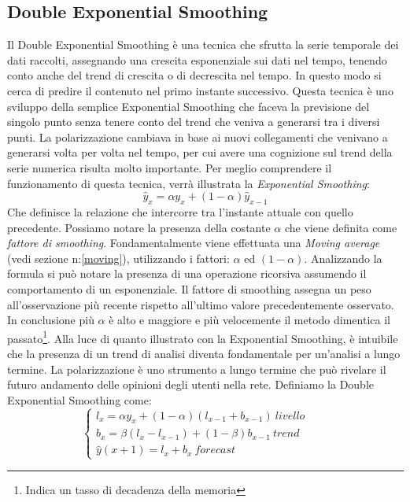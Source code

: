 \subsection{Double Exponential Smoothing}
Il Double Exponential Smoothing è una tecnica che sfrutta la serie temporale dei dati raccolti, assegnando una crescita esponenziale sui dati nel tempo, tenendo conto anche del trend di crescita o di decrescita nel tempo. In questo modo si cerca di predire il contenuto nel primo instante successivo.
Questa tecnica è uno sviluppo della semplice Exponential Smoothing che faceva la previsione del singolo punto senza tenere conto del trend che veniva a generarsi tra i diversi punti. 
La polarizzazione cambiava in base ai nuovi collegamenti che venivano a generarsi volta per volta nel tempo, per cui avere una cognizione sul trend della serie numerica risulta molto importante.
Per meglio comprendere il funzionamento di questa tecnica, verrà illustrata la \textit{Exponential Smoothing}:
\begin{equation}\label{singleExp}
\widehat{y}_{x}= \alpha y_{x} + (1-\alpha)\widehat{y}_{x-1}
\end{equation}
Che definisce la relazione che intercorre tra l'instante attuale con quello precedente. Possiamo notare la presenza della costante $\alpha$ che viene definita come \textit{fattore di smoothing}. Fondamentalmente viene effettuata una \textit{Moving average} (vedi sezione n:\ref{moving}), utilizzando i fattori: $\alpha$ ed $(1-\alpha)$.
Analizzando la formula si può notare la presenza di una operazione ricorsiva assumendo il comportamento di un esponenziale.
Il fattore di smoothing assegna un peso all'osservazione più recente rispetto all'ultimo valore precedentemente osservato. In conclusione più $\alpha$ è alto e maggiore e più velocemente il metodo dimentica il passato\footnote{Indica un tasso di decadenza della memoria}.
Alla luce di quanto illustrato con la Exponential Smoothing, è intuibile che la presenza di un trend di analisi diventa fondamentale per un'analisi a lungo termine. La polarizzazione è uno strumento a lungo termine che può rivelare il futuro andamento delle opinioni degli utenti nella rete.
Definiamo la Double Exponential Smoothing come:
\[
\begin{cases}
    l_{x}= \alpha y_{x} +(1-\alpha)(l_{x-1}+ b_{x-1}) \ livello        & \quad \\
    b_{x}= \beta (l_{x}-l_{x-1}) +(1-\beta)b_{x-1}  \ trend        & \quad \\
   \widehat{y}(x+1)=  l_{x} + b_{x} \ forecast    & \quad 
  \end{cases}
\]
